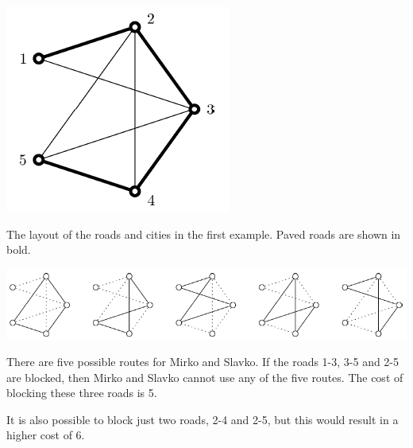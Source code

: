 \includegraphics{training1.png}

The layout of the roads and cities in the first example. Paved roads are shown in bold.

\includegraphics[scale=0.8]{training2.png}

There are five possible routes for Mirko and Slavko. If the roads 1-3, 3-5 and 2-5 are blocked, then Mirko and Slavko cannot use any of the five routes. The cost of blocking these three roads is 5.

It is also possible to block just two roads, 2-4 and 2-5, but this would result in a higher cost of 6.